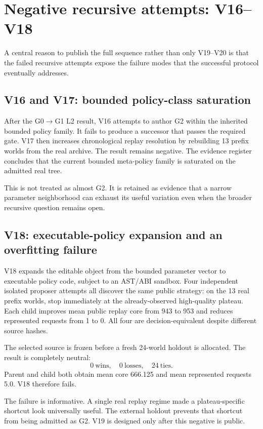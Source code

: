 \section{Negative recursive attempts: V16--V18}

A central reason to publish the full sequence rather than only V19--V20 is that the failed recursive attempts expose the failure modes that the successful protocol eventually addresses.

\subsection{V16 and V17: bounded policy-class saturation}

After the G0$\rightarrow$G1 L2 result, V16 attempts to author G2 within the inherited bounded policy family. It fails to produce a successor that passes the required gate. V17 then increases chronological replay resolution by rebuilding 13 prefix worlds from the real archive. The result remains negative. The evidence register concludes that the current bounded meta-policy family is saturated on the admitted real tree.

This is not treated as almost G2. It is retained as evidence that a narrow parameter neighborhood can exhaust its useful variation even when the broader recursive question remains open.

\subsection{V18: executable-policy expansion and an overfitting failure}

V18 expands the editable object from the bounded parameter vector to executable policy code, subject to an AST/ABI sandbox. Four independent isolated proposer attempts all discover the same public strategy: on the 13 real prefix worlds, stop immediately at the already-observed high-quality plateau. Each child improves mean public replay core from 943 to 953 and reduces represented requests from 1 to 0. All four are decision-equivalent despite different source hashes.

The selected source is frozen before a fresh 24-world holdout is allocated. The result is completely neutral:
\[
0\ \text{wins},\quad 0\ \text{losses},\quad 24\ \text{ties}.
\]
Parent and child both obtain mean core 666.125 and mean represented requests 5.0. V18 therefore fails.

The failure is informative. A single real replay regime made a plateau-specific shortcut look universally useful. The external holdout prevents that shortcut from being admitted as G2. V19 is designed only after this negative is public.

